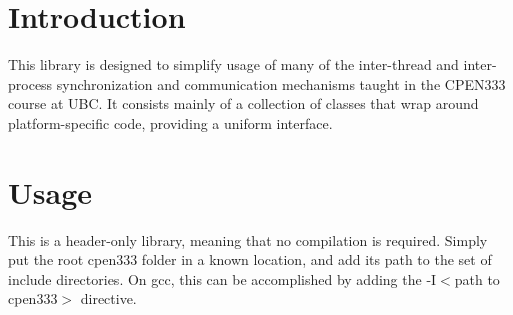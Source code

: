 \hypertarget{index_sec_intro}{}\section{Introduction}\label{index_sec_intro}
This library is designed to simplify usage of many of the inter-\/thread and inter-\/process synchronization and communication mechanisms taught in the C\+P\+E\+N333 course at U\+BC. It consists mainly of a collection of classes that wrap around platform-\/specific code, providing a uniform interface.\hypertarget{index_sec_usage}{}\section{Usage}\label{index_sec_usage}
This is a header-\/only library, meaning that no compilation is required. Simply put the root {\ttfamily cpen333} folder in a known location, and add its path to the set of include directories. On {\ttfamily gcc}, this can be accomplished by adding the {\ttfamily -\/I$<$path to cpen333$>$} directive. 